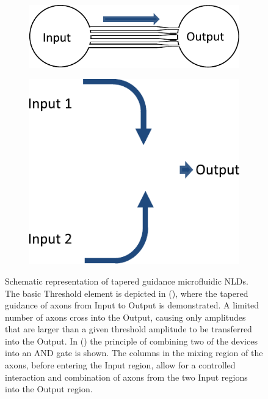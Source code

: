 \begin{figure}
\begin{center}
\begin{subfigure}[b]{0.4\linewidth}
\begin{center}
\includegraphics[width=.9\linewidth]{../fig/expdesign1a.pdf}\caption{}\label{fig:expdesign1a}
\end{center}
\end{subfigure}
\begin{subfigure}[b]{0.4\linewidth}
\begin{center}
\includegraphics[width=0.5\linewidth]{../fig/expdesign1b.pdf}\caption{}\label{fig:expdesign1b}
\end{center}
\end{subfigure}
\caption{Schematic representation of tapered guidance microfluidic NLDs. The basic Threshold element is depicted in (), where the tapered guidance of axons from Input to Output is demonstrated. A limited number of axons cross into the Output, causing only amplitudes that are larger than a given threshold amplitude to be transferred into the Output. In () the principle of combining two of the devices into an AND gate is shown. The columns in the mixing region of the axons, before entering the Input region, allow for a controlled interaction and combination of axons from the two Input regions into the Output region.}\label{fig:expdesign}
\end{center}
\end{figure}

